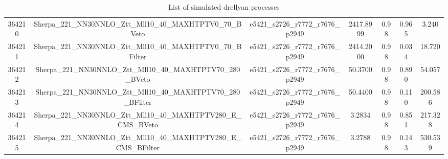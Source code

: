 \begin{table}[htbp]
\begin{center}
{\begin{tabular}{ccccccc}
364210 & Sherpa\_221\_NN30NNLO\_Ztt\_Mll10\_40\_MAXHTPTV0\_70\_BVeto & e5421\_s2726\_r7772\_r7676\_p2949 & 2417.8999 & 0.98 & 0.965 & 3.240 \\ 
364211 & Sherpa\_221\_NN30NNLO\_Ztt\_Mll10\_40\_MAXHTPTV0\_70\_BFilter & e5421\_s2726\_r7772\_r7676\_p2949 & 2414.2000 & 0.98 & 0.034 & 18.720 \\ 
364212 & Sherpa\_221\_NN30NNLO\_Ztt\_Mll10\_40\_MAXHTPTV70\_280\_BVeto & e5421\_s2726\_r7772\_r7676\_p2949 & 50.3700 & 0.98 & 0.890 & 54.057 \\ 
364213 & Sherpa\_221\_NN30NNLO\_Ztt\_Mll10\_40\_MAXHTPTV70\_280\_BFilter & e5421\_s2726\_r7772\_r7676\_p2949 & 50.4400 & 0.98 & 0.110 & 200.586 \\ 
364214 & Sherpa\_221\_NN30NNLO\_Ztt\_Mll10\_40\_MAXHTPTV280\_E\_CMS\_BVeto & e5421\_s2726\_r7772\_r7676\_p2949 & 3.2834 & 0.98 & 0.851 & 217.328 \\ 
364215 & Sherpa\_221\_NN30NNLO\_Ztt\_Mll10\_40\_MAXHTPTV280\_E\_CMS\_BFilter & e5421\_s2726\_r7772\_r7676\_p2949 & 3.2788 & 0.98 & 0.143 & 530.539 \\ 
\hline
\end{tabular}}
\end{center}
\caption{List of simulated drellyan processes}
\label{table:drellyan}
\end{table} 
